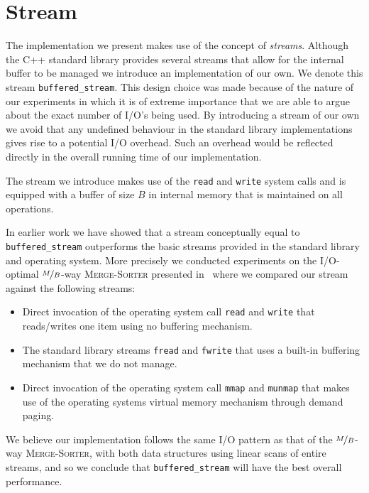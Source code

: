 \documentclass[twoside,11pt,openright]{report}
\begin{document}
\section{Stream}
The implementation we present makes use of the concept of \textit{streams}. Although the C++ standard library provides several streams that allow for the internal buffer to be managed we introduce an implementation of our own. We denote this stream \texttt{buffered\_stream}. This design choice was made because of the nature of our experiments in which it is of extreme importance that we are able to argue about the exact number of I/O's being used. By introducing a stream of our own we avoid that any undefined behaviour in the standard library implementations gives rise to a potential I/O overhead. Such an overhead would be reflected directly in the overall running time of our implementation.

The stream we introduce makes use of the \texttt{read} and \texttt{write} system calls and is equipped with a buffer of size $B$ in internal memory that is maintained on all operations.

In earlier work we have showed that a stream conceptually equal to \texttt{buffered\_stream} outperforms the basic streams provided in the standard library and operating system. %
More precisely we conducted experiments on the I/O-optimal $\nicefrac{M}{B}$-way \textsc{Merge-Sorter} presented in~\cite{Aggarwal:1988/ICS/48529.48535} where we compared our stream against the following streams:

\begin{itemize}
	\item Direct invocation of the operating system call \texttt{read} and \texttt{write} that reads/writes one item using no buffering mechanism.
	\item The standard library streams \texttt{fread} and \texttt{fwrite} that uses a built-in buffering mechanism that we do not manage.
	\item Direct invocation of the operating system call \texttt{mmap} and \texttt{munmap} that makes use of the operating systems virtual memory mechanism through demand paging.
\end{itemize}

We believe our implementation follows the same I/O pattern as that of the $\nicefrac{M}{B}$-way \textsc{Merge-Sorter}, with both data structures using linear scans of entire streams, and so we conclude that \texttt{buffered\_stream} will have the best overall performance.
\end{document}
